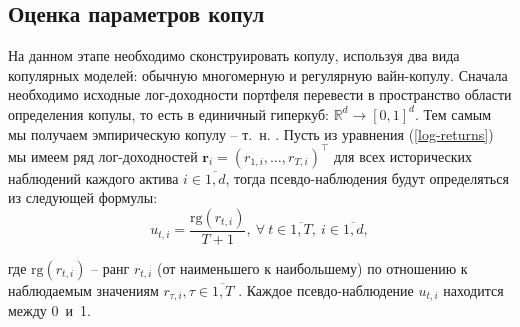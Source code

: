 \subsection{Оценка параметров копул}
\label{methodology:copula}

На данном этапе необходимо сконструировать копулу, используя два вида копулярных моделей: обычную многомерную и регулярную вайн-копулу. 
Сначала необходимо исходные лог-доходности портфеля перевести в пространство области определения копулы, то есть в единичный гиперкуб: $\mathbb{R}^d \to [0, 1]^d$. Тем самым мы получаем эмпирическую копулу -- т.~н. . 
Пусть из уравнения (\ref{log-returns}) мы имеем ряд лог-доходностей $\boldsymbol{r}_i = (r_{1,i}, \ldots, r_{T,i})^\intercal$ для всех исторических наблюдений каждого актива $i \in \overline{1, d}$, тогда псевдо-наблюдения будут определяться из следующей формулы:
%
\begin{equation} \label{pobs}
    u_{t,i} = \frac{\text{rg}(r_{t,i})}{T + 1}, \ \forall \ t \in \overline{1, T},\ i \in \overline{1, d},
\end{equation}

\noindent где $\text{rg}(r_{t,i})$ -- ранг $r_{t,i}$ (от наименьшего к наибольшему) по отношению к наблюдаемым значениям $r_{\tau,i}, \tau \in \overline{1,T}$ \cite{Copula}. Каждое псевдо-наблюдение $u_{t,i}$ находится между 0~и~1.

